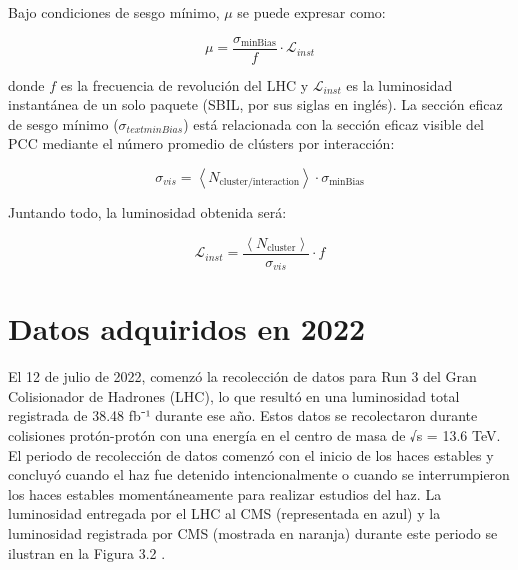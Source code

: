 Bajo condiciones de sesgo mínimo, $\mu$ se puede expresar como: 

\begin{equation}
\mu = \frac{\sigma_{\text{minBias}}}{f} \cdot \mathcal{L}_{inst}
\end{equation}

donde $f$ es la frecuencia de revolución del LHC y $\mathcal{L}_{inst}$ es la luminosidad instantánea de un solo paquete (SBIL, por sus siglas en inglés). La sección eficaz de sesgo mínimo ($\sigma_{text{minBias}}$) está relacionada con la sección eficaz visible del PCC mediante el número promedio de clústers por interacción:

\begin{equation}
\sigma_{vis}= \left < N_{\text{cluster}/\text{interaction}} \right >\cdot \sigma_{\text{minBias}}
\end{equation}

Juntando todo, la luminosidad obtenida será:

\begin{equation}
\mathcal{L}_{inst}=\frac{\left < N_{\text{cluster}} \right >}{\sigma_{vis}} \cdot f
\end{equation}




\section{Datos adquiridos en 2022}

El 12 de julio de 2022, comenzó la recolección de datos para Run 3 del Gran Colisionador de Hadrones (LHC), lo que resultó en una luminosidad total registrada de 38.48 fb⁻¹ durante ese año. Estos datos se recolectaron durante colisiones protón-protón con una energía en el centro de masa de √s = 13.6 TeV. El periodo de recolección de datos comenzó con el inicio de los haces estables y concluyó cuando el haz fue detenido intencionalmente o cuando se interrumpieron los haces estables momentáneamente para realizar estudios del haz. La luminosidad entregada por el LHC al CMS (representada en azul) y la luminosidad registrada por CMS (mostrada en naranja) durante este periodo se ilustran en la Figura 3.2 \citep{wikicern}.

